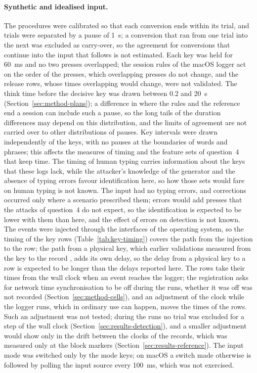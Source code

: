 \paragraph{Synthetic and idealised input.} The procedures were calibrated so that each conversion ends within its trial,
and trials were separated by a pause of 1~s; a conversion that ran from one trial into the next was excluded as
carry-over, so the agreement for conversions that continue into the input that follows is not estimated. Each key was
held for 60~ms and no two presses overlapped; the session rules of the macOS logger act on the order of the presses,
which overlapping presses do not change, and the release rows, whose times overlapping would change, were not validated.
The think time before the decisive key was drawn between 0.2 and 20~s (Section~\ref{sec:method-plans}); a difference
in where the rules and the reference end a session can include such a pause, so the long tails of the duration
differences may depend on this distribution, and the limits of agreement are not carried over to other distributions
of pauses. Key intervals were drawn independently of the keys, with no pauses at the boundaries of words and phrases;
this affects the measures of timing and the feature sets of question~4 that keep time. The timing of human typing
carries information about the keys \citep{monaco2018} that these logs lack, while the attacker's knowledge of the
generator and the absence of typing errors favour identification here, so how those sets would fare on human typing is
not known. The input had no typing errors, and
corrections occurred only where a scenario prescribed them; errors would add presses that the attacks of question~4 do
not expect, so the identification is expected to be lower with them than here, and the effect of errors on detection is
not known. The events were injected through the interfaces of the operating system, so the timing of the key rows
(Table~\ref{tab:key-timing}) covers the path from the injection to the row; the path from a physical key, which earlier
validations measured from the key to the record \citep{pinet2017}, adds its own delay, so the delay from a physical key
to a row is expected to be longer than the delays reported here. The rows take their times from the wall clock when an
event reaches the logger; the registration asks for network time synchronisation to be off during the runs, whether it
was off was not recorded (Section~\ref{sec:method-cells}), and an adjustment of the clock while the logger runs, which
in ordinary use can happen, moves the times of the rows. Such an adjustment was not tested; during the runs no trial was
excluded for a step of the wall clock (Section~\ref{sec:results-detection}), and a smaller adjustment would show only in
the drift between the clocks of the records, which was measured only at the block markers
(Section~\ref{sec:results-reference}). The input mode was switched only by the mode keys; on macOS a switch made
otherwise is followed by polling the input source every 100~ms, which was not exercised.

